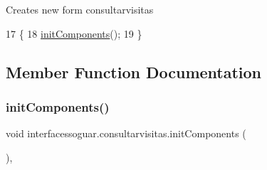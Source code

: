 Creates new form consultarvisitas 
\begin{DoxyCode}
17                               \{
18         \mbox{\hyperlink{classinterfacessoguar_1_1consultarvisitas_a7d0aee641984608c0e784f282f761d03}{initComponents}}();
19     \}
\end{DoxyCode}


\subsection{Member Function Documentation}
\mbox{\label{classinterfacessoguar_1_1consultarvisitas_a7d0aee641984608c0e784f282f761d03}} 
\subsubsection{\texorpdfstring{init\+Components()}{initComponents()}}
{\footnotesize\ttfamily void interfacessoguar.\+consultarvisitas.\+init\+Components (\begin{DoxyParamCaption}{ }\end{DoxyParamCaption})\hspace{0.3cm}{\ttfamily [inline]}, {\ttfamily [private]}}

